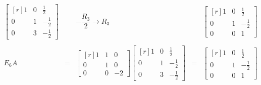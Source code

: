 \begin{enumerate}
    $$\begin{array}{rcccc}
	\begin{bmatrix*}[r]
	    1 & 0 & \frac{1}{2}\\
	    0 & 1 & -\frac{1}{2}\\
	    0 & 3 & -\frac{1}{2}
	\end{bmatrix*} && -\dfrac{R_3}{2}\to R_3 & &
	\begin{bmatrix*}[r]
	    1 & 0 & \frac{1}{2}\\
	    0 & 1 & -\frac{1}{2}\\
	    0 & 0 & 1 
	\end{bmatrix*} \\\\
	E_6A&=&\begin{bmatrix*}[r]
	    1 & 1 & 0\\
	    0 & 1 & 0\\
	    0 & 0 & -2 
	\end{bmatrix*} 
	\begin{bmatrix*}[r]
	    1 & 0 & \frac{1}{2}\\
	    0 & 1 & -\frac{1}{2}\\
	    0 & 3 & -\frac{1}{2}
	\end{bmatrix*} &=& 
	\begin{bmatrix*}[r]
	    1 & 0 & \frac{1}{2}\\
	    0 & 1 & -\frac{1}{2}\\
	    0 & 0 & 1 
	\end{bmatrix*} \\\\
    \end{array}$$


\end{enumerate}
